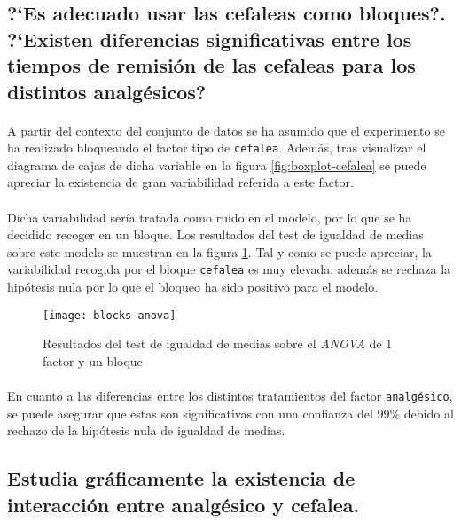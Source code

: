 \documentclass[11pt]{article}
\begin{document}
    \subsection{?`Es adecuado usar las cefaleas como bloques?. ?`Existen diferencias significativas entre los tiempos de remisión de las cefaleas para los distintos analgésicos?}

      \paragraph{}
      A partir del contexto del conjunto de datos se ha asumido que el experimento se ha realizado bloqueando el factor tipo de \texttt{cefalea}. Además, tras visualizar el diagrama de cajas de dicha variable en la figura \ref{fig:boxplot-cefalea} se puede apreciar la existencia de gran variabilidad referida a este factor.

      \paragraph{}
      Dicha variabilidad sería tratada como ruido en el modelo, por lo que se ha decidido recoger en un bloque. Los resultados del test de igualdad de medias sobre este modelo se muestran en la figura \ref{fig:1f1b-anova-results}. Tal y como se puede apreciar, la variabilidad recogida por el bloque \texttt{cefalea} es muy elevada, además se rechaza la hipótesis nula por lo que el bloqueo ha sido positivo para el modelo.

      \begin{figure}[!h]
        \centering
        \texttt{[image: blocks-anova]}
        \caption{Resultados del test de igualdad de medias sobre el \emph{ANOVA} de 1 factor y un bloque}
        \label{fig:1f1b-anova-results}
      \end{figure}

      \paragraph{}
      En cuanto a las diferencias entre los distintos tratamientos del factor \texttt{analgésico}, se puede asegurar que estas son significativas con una confianza del $99\%$ debido al rechazo de la hipótesis nula de igualdad de medias.

    \subsection{Estudia gráficamente la existencia de interacción entre analgésico y cefalea.}
\end{document}
